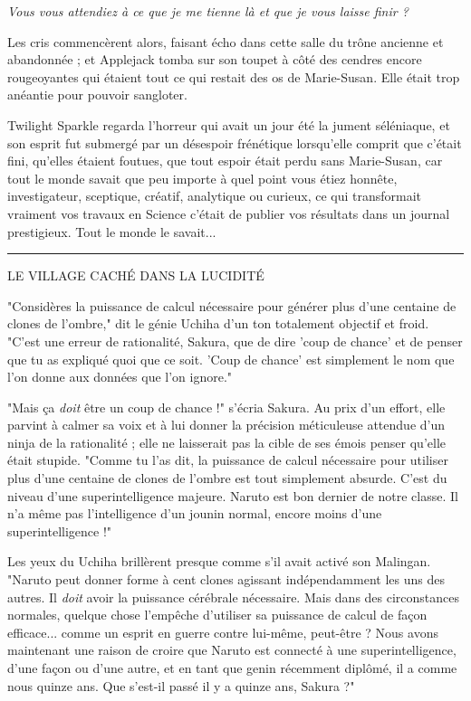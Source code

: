 \emph{Vous vous attendiez à ce que je me tienne là et que je vous laisse finir ?} 

Les cris commencèrent alors, faisant écho dans cette salle du trône ancienne et abandonnée ; et Applejack tomba sur son toupet à côté des cendres encore rougeoyantes qui étaient tout ce qui restait des os de Marie-Susan. Elle était trop anéantie pour pouvoir sangloter.

Twilight Sparkle regarda l'horreur qui avait un jour été la jument séléniaque, et son esprit fut submergé par un désespoir frénétique lorsqu'elle comprit que c'était fini, qu'elles étaient foutues, que tout espoir était perdu sans Marie-Susan, car tout le monde savait que peu importe à quel point vous étiez honnête, investigateur, sceptique, créatif, analytique ou curieux, ce qui transformait vraiment vos travaux en Science c'était de publier vos résultats dans un journal prestigieux. Tout le monde le savait...
\par\noindent\rule{\textwidth}{0.4pt}

\begin{center}LE VILLAGE CACHÉ DANS LA LUCIDITÉ\end{center}


"Considères la puissance de calcul nécessaire pour générer plus d'une centaine de clones de l'ombre," dit le génie Uchiha d'un ton totalement objectif et froid. "C'est une erreur de rationalité, Sakura, que de dire 'coup de chance' et de penser que tu as expliqué quoi que ce soit. 'Coup de chance' est simplement le nom que l'on donne aux données que l'on ignore."

"Mais ça \emph{doit}  être un coup de chance !" s'écria Sakura. Au prix d'un effort, elle parvint à calmer sa voix et à lui donner la précision méticuleuse attendue d'un ninja de la rationalité ; elle ne laisserait pas la cible de ses émois penser qu'elle était stupide. "Comme tu l'as dit, la puissance de calcul nécessaire pour utiliser plus d'une centaine de clones de l'ombre est tout simplement absurde. C'est du niveau d'une superintelligence majeure. Naruto est bon dernier de notre classe. Il n'a même pas l'intelligence d'un jounin normal, encore moins d'une superintelligence !"

Les yeux du Uchiha brillèrent presque comme s'il avait activé son Malingan. "Naruto peut donner forme à cent clones agissant indépendamment les uns des autres. Il \emph{doit}  avoir la puissance cérébrale nécessaire. Mais dans des circonstances normales, quelque chose l'empêche d'utiliser sa puissance de calcul de façon efficace... comme un esprit en guerre contre lui-même, peut-être ? Nous avons maintenant une raison de croire que Naruto est connecté à une superintelligence, d'une façon ou d'une autre, et en tant que genin récemment diplômé, il a comme nous quinze ans. Que s'est-il passé il y a quinze ans, Sakura ?"

